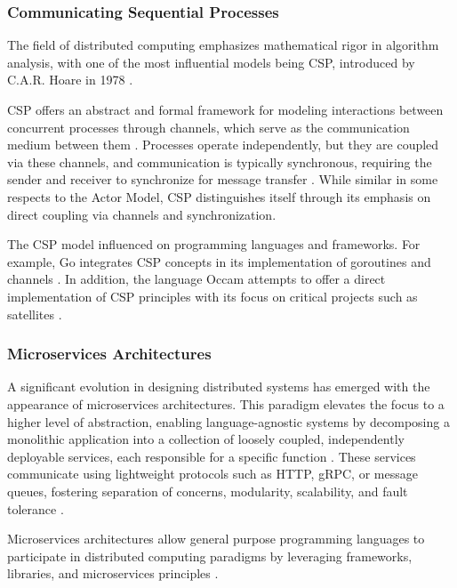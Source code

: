 \subsubsection{Communicating Sequential Processes}

The field of distributed computing emphasizes mathematical rigor in algorithm analysis, with one of the most influential models being \gls{CSP}, introduced by C.A.R. Hoare in 1978 \cite{Hoare1978}.

\gls{CSP} offers an abstract and formal framework for modeling interactions between concurrent processes through channels, which serve as the communication medium between them \cite{Paduraru2018}. Processes operate independently, but they are coupled via these channels, and communication is typically synchronous, requiring the sender and receiver to synchronize for message transfer \cite{Hoare1978}. While similar in some respects to the Actor Model, \gls{CSP} distinguishes itself through its emphasis on direct coupling via channels and synchronization.

The \gls{CSP} model influenced on programming languages and frameworks. For example, Go integrates \gls{CSP} concepts in its implementation of goroutines and channels \cite{go-docs, Valkov2018,Paduraru2018}. In addition, the language Occam attempts to offer a direct implementation of \gls{CSP} principles with its focus on critical projects such as satellites \cite{Brolos2021}.

\subsubsection{Microservices Architectures}

A significant evolution in designing distributed systems has emerged with the appearance of microservices architectures. This paradigm elevates the focus to a higher level of abstraction, enabling language-agnostic systems by decomposing a monolithic application into a collection of loosely coupled, independently deployable services, each responsible for a specific function \cite{Jamshidi2018}. These services communicate using lightweight protocols such as \gls{HTTP}, \gls{gRPC}, or message queues, fostering separation of concerns, modularity, scalability, and fault tolerance \cite{Jamshidi2018}.

Microservices architectures allow general purpose programming languages to participate in distributed computing paradigms by leveraging frameworks, libraries, and microservices principles \cite{Guidi2017}.

